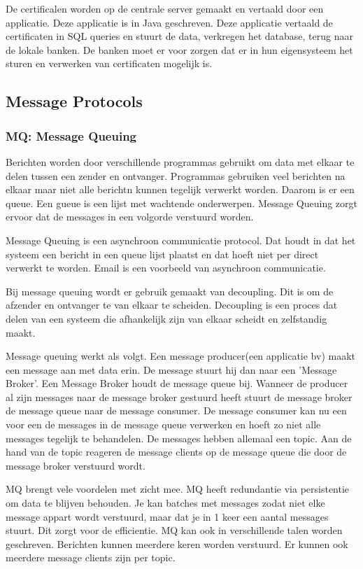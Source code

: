 \documentclass{article}
\begin{document}
De certificalen worden op de centrale server gemaakt en vertaald door een applicatie.
Deze applicatie is in Java geschreven.
Deze applicatie vertaald de certificaten in SQL queries en stuurt de data,
verkregen het database, terug naar de lokale banken.
De banken moet er voor zorgen dat er in hun eigensysteem het sturen en
verwerken van certificaten mogelijk is.

\subsection{Message Protocols}

\subsubsection{MQ: Message Queuing}
Berichten worden door verschillende programmas gebruikt
om data met elkaar te delen tussen een zender en ontvanger.
Programmas gebruiken veel berichten na elkaar maar niet
alle berichtn kunnen tegelijk verwerkt worden.
Daarom is er een queue. Een gueue is een lijst met wachtende onderwerpen.
Message Queuing zorgt ervoor dat de messages in een volgorde verstuurd worden.

Message Queuing is een asynchroon communicatie protocol.
Dat houdt in dat het systeem een bericht in een queue lijst plaatst
en dat hoeft niet per direct verwerkt te worden.
Email is een voorbeeld van asynchroon communicatie.

Bij message queuing wordt er gebruik gemaakt van decoupling.
Dit is om de afzender en ontvanger te van elkaar te scheiden.
Decoupling is een proces dat delen van een systeem die afhankelijk
zijn van elkaar scheidt en zelfstandig maakt.

Message queuing werkt als volgt.
Een message producer(een applicatie bv) maakt een message aan met data erin.
De message stuurt hij dan naar een 'Message Broker'.
Een Message Broker houdt de message queue bij.
Wanneer de producer al zijn messages naar de message broker
gestuurd heeft stuurt de message broker de message queue naar
de message consumer.
De message consumer kan nu een voor een de messages in de message queue
verwerken en hoeft zo niet alle messages tegelijk te behandelen.
De messages hebben allemaal een topic.
Aan de hand van de topic reageren de message clients op de message queue die
door de message broker verstuurd wordt.


MQ brengt vele voordelen met zicht mee.
MQ heeft redundantie via persistentie om data te blijven behouden.
Je kan batches met messages zodat niet elke message appart wordt
verstuurd, maar dat je in 1 keer een aantal messages stuurt.
Dit zorgt voor de efficientie.
MQ kan ook in verschillende talen worden geschreven.
Berichten kunnen meerdere keren worden verstuurd.
Er kunnen ook meerdere message clients zijn per topic.
\end{document}
